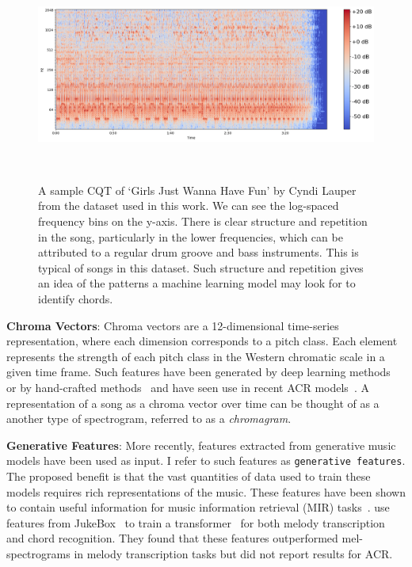 \begin{figure}[H]
    \centering
    \includegraphics[width=1\textwidth]{figures/sample_cqt.png}
    \caption{A sample CQT of `Girls Just Wanna Have Fun' by Cyndi Lauper from the dataset used in this work. We can see the log-spaced frequency bins on the y-axis. There is clear structure and repetition in the song, particularly in the lower frequencies, which can be attributed to a regular drum groove and bass instruments. This is typical of songs in this dataset. Such structure and repetition gives an idea of the patterns a machine learning model may look for to identify chords.}~\label{fig:cqt_example}
\end{figure}

\textbf{Chroma Vectors}: Chroma vectors are a 12-dimensional time-series representation, where each dimension corresponds to a pitch class. Each element represents the strength of each pitch class in the Western chromatic scale in a given time frame. Such features have been generated by deep learning methods~\citep{BalanceRandomForestACR} or by hand-crafted methods~\citep{NNLSChroma,librosa} and have seen use in recent ACR models~\citep{HarmonyTransformer}. A representation of a song as a chroma vector over time can be thought of as a another type of spectrogram, referred to as a \emph{chromagram}.

\textbf{Generative Features}: More recently, features extracted from generative music models have been used as input. I refer to such features as \texttt{generative features}. The proposed benefit is that the vast quantities of data used to train these models requires rich representations of the music. These features have been shown to contain useful information for music information retrieval (MIR) tasks~\citep{GenerativeFeaturesforMIR}. \citet{MelodyTranscriptionViaGenerativePreTraining} use features from JukeBox~\citep{Jukebox} to train a transformer~\citep{AttentionIsAllYouNeed} for both melody transcription and chord recognition. They found that these features outperformed mel-spectrograms in melody transcription tasks but did not report results for ACR.


